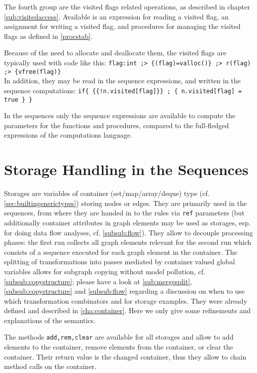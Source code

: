 The fourth group are the visited flags related operations,
as described in chapter \ref{sub:visitedaccess}.
Available is an expression for reading a visited flag, an assignment for writing a visited flag, and procedures for managing the visited flags as defined in \ref{procstab}.

\begin{example}
Because of the need to allocate and deallocate them, the visited flags are typically used with code like this:
\verb#flag:int ;> {(flag)=valloc()} ;> r(flag) ;> {vfree(flag)}#\\
In addition, they may be read in the sequence expressions, and written in the sequence computations:
\verb#if{ {{!n.visited[flag]}} ; { n.visited[flag] = true } }#
\end{example}

In the sequences only the sequence expressions are available to compute the parameters for the functions and procedures, compared to the full-fledged expressions of the computations language.

\pagebreak

\section{Storage Handling in the Sequences}\label{sec:storages}
Storages are variables of container (set/map/array/deque) type (cf. \ref{sec:builtingenerictypes}) storing nodes or edges.
They are primarily used in the sequences, from where they are handed in to the rules via \texttt{ref} parameters (but additionally container attributes in graph elements may be used as storages,
esp. for doing data flow analyses, cf. \ref{subsub:flow}).
They allow to decouple processing phases: the first run collects all graph elements relevant for the second run which consists of a sequence executed for each graph element in the container.
The splitting of transformations into passes mediated by container valued global variables allows for subgraph copying without model pollution, cf. \ref{subsub:copystructure}; please have a look at \ref{sub:mergesplit}, \ref{subsub:copystructure} and \ref{subsub:flow} regarding a discussion on when to use which transformation combinators and for storage examples.
They were already defined and described in \ref{cha:container}.
Here we only give some refinements and explanations of the semantics.

The methods \texttt{add,rem,clear} are available for all storages and allow to add elements to the container, remove elements from the container, or clear the container.
Their return value is the changed container, thus they allow to chain method calls on the container.

